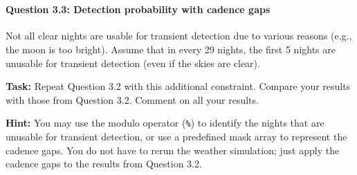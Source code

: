 \documentclass[11pt]{article}
\begin{document}
    \begin{center}
    \end{center}
    { \hspace*{\fill} \\}
    
    \paragraph{Question 3.3: Detection probability with cadence
gaps}\label{question-3.3-detection-probability-with-cadence-gaps}

Not all clear nights are usable for transient detection due to various
reasons (e.g., the moon is too bright). Assume that in every 29 nights,
the first 5 nights are unusable for transient detection (even if the
skies are clear).

\textbf{Task:} Repeat Question 3.2 with this additional constraint.
Compare your results with those from Question 3.2. Comment on all your
results.

\textbf{Hint:} You may use the modulo operator (\texttt{\%}) to identify
the nights that are unusable for transient detection, or use a
predefined mask array to represent the cadence gaps. You do not have to
rerun the weather simulation; just apply the cadence gaps to the results
from Question 3.2.
\end{document}
